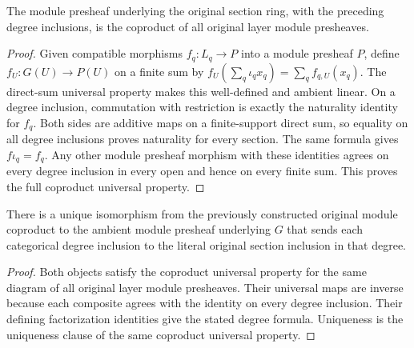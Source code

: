 \begin{theorem}
\label{hir:real-domain-actual-normal-associated-module-ring-coproduct}
\leanok
The module presheaf underlying the original section ring, with the
preceding degree inclusions, is the coproduct of all original layer
module presheaves.
\end{theorem}
\begin{proof}
Given compatible morphisms $f_q:L_q\to P$ into a module presheaf $P$,
define $f_U:G(U)\to P(U)$ on a finite sum by
$f_U(\sum_q\iota_q x_q)=\sum_q f_{q,U}(x_q)$. The direct-sum universal
property makes this well-defined and ambient linear. On a degree
inclusion, commutation with restriction is exactly the naturality
identity for $f_q$. Both sides are additive maps on a finite-support
direct sum, so equality on all degree inclusions proves naturality
for every section. The same formula gives $f\iota_q=f_q$. Any other
module presheaf morphism with these identities agrees on every
degree inclusion in every open and hence on every finite sum. This
proves the full coproduct universal property.
\end{proof}

\begin{corollary}
\label{hir:real-domain-actual-normal-associated-module-ring-presheaf-comparison}
\leanok
There is a unique isomorphism from the previously constructed original
module coproduct to the ambient module presheaf underlying $G$ that
sends each categorical degree inclusion to the literal original
section inclusion in that degree.
\end{corollary}
\begin{proof}
Both objects satisfy the coproduct universal property for the same
diagram of all original layer module presheaves. Their universal maps
are inverse because each composite agrees with the identity on every
degree inclusion. Their defining factorization identities give the
stated degree formula. Uniqueness is the uniqueness clause of the
same coproduct universal property.
\end{proof}
